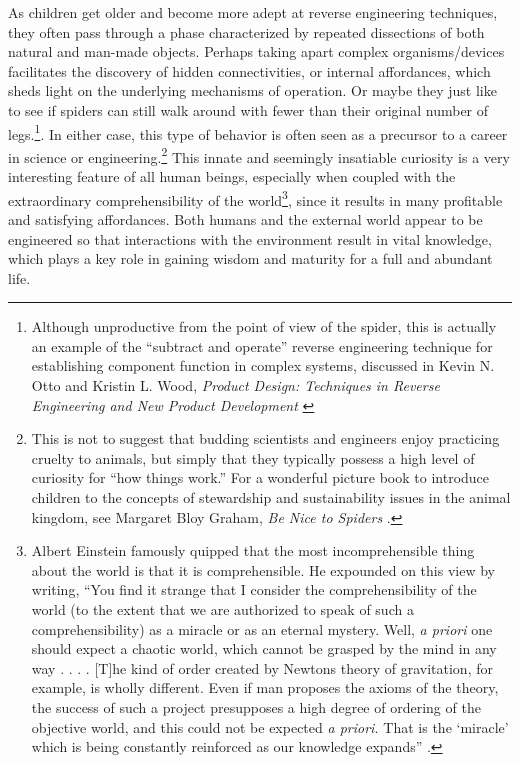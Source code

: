 As children get older and become more adept at reverse engineering
techniques, they often pass through a phase characterized by repeated
dissections of both natural and man-made objects. Perhaps taking apart
complex organisms/devices facilitates the discovery of hidden
connectivities, or internal affordances, which sheds light on the
underlying mechanisms of operation. Or maybe they just like to see if
spiders can still walk around with fewer than their original number of
legs.\footnote{Although unproductive from the point of view of the
spider, this is actually an example of the “subtract and operate”
reverse engineering technique for establishing component function in
complex systems, discussed in Kevin N. Otto and Kristin L. Wood,
\textit{Product Design: Techniques in Reverse Engineering and New Product Development} \citep[][pp. 159--162, 204--211]{ottowood2001}}.
In either case, this type of behavior is often
seen as a precursor to a career in science or
engineering.\footnote{
This is not to suggest that budding scientists and
engineers enjoy practicing cruelty to animals, but simply that they
typically possess a high level of curiosity for “how things work.” For
a wonderful picture book to introduce children to the concepts of
stewardship and sustainability issues in the animal kingdom, see
Margaret Bloy Graham, \textit{Be Nice to Spiders} \citep{graham1967}.
}
This innate and seemingly insatiable
curiosity is a very interesting feature of all human beings, especially
when coupled with the extraordinary comprehensibility of the
world\footnote{
Albert Einstein famously quipped that the most
incomprehensible thing about the world is that it is comprehensible. He
expounded on this view by writing, ``You find it strange that I consider
the comprehensibility of the world (to the extent that we are
authorized to speak of such a comprehensibility) as a miracle or as an
eternal mystery. Well, \textit{a priori} one should expect a chaotic
world, which cannot be grasped by the mind in any way . . . . [T]he
kind of order created by Newton{\textquotesingle}s theory of
gravitation, for example, is wholly different. Even if man proposes the
axioms of the theory, the success of such a project presupposes a high
degree of ordering of the objective world, and this could not be
expected \textit{a priori.} That is the
`miracle' which is being constantly
reinforced as our knowledge expands'' \citep[][p.~131]{einstein1987}.
}, since it results in many profitable and
satisfying affordances. Both humans and the external world appear to be
engineered so that interactions with the environment result in vital
knowledge, which plays a key role in gaining wisdom and maturity for a
full and abundant life.  %

